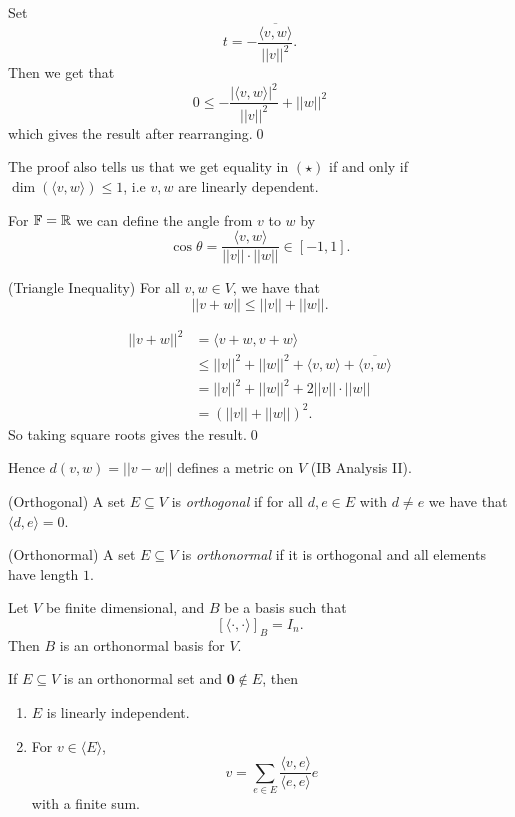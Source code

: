 \documentclass{article}
\newcommand{\F}{\mathbb{F}}
\begin{document}
Set 
\[
t=-\frac{\overline{\langle v,w\rangle}}{||v||^2}.
\]
Then we get that
\[
	0\le -\frac{|\langle v,w\rangle|^2}{||v||^2}+||w||^2
\]
which gives the result after rearranging.\qed
\begin{remark}
  The proof also tells us that we get equality in $ (\star) $ if and only if $ \dim(\langle v,w\rangle)\le 1 $, i.e $ v,w $ are linearly dependent.
\end{remark}
\begin{remark}
  For $ \F=\R $ we can define the angle from $ v $ to $ w $ by
  \[
	  \cos\theta=\frac{\langle v,w\rangle}{||v||\cdot||w||}\in [-1,1].
  \]
\end{remark}
\begin{corollary}
	(Triangle Inequality) For all $ v,w\in V $, we have that
	\[
	  ||v+w||\le ||v||+||w||.
	\]
\end{corollary}
\pf \begin{align*}
	||v+w||^2 &=\langle v+w,v+w\rangle\\
		  &\le ||v||^2+||w||^2+\langle v,w\rangle +\overline{\langle v,w\rangle}\\
		  &=||v||^2+||w||^2+2||v||\cdot||w||\\
		  &=(||v||+||w||)^2.
\end{align*}
So taking square roots gives the result.\qed
\par
Hence $ d(v,w)=||v-w|| $ defines a metric on $ V $ (IB Analysis II).
\begin{definition}
	(Orthogonal) A set $ E\subseteq V $ is \textit{orthogonal} if for all $ d,e\in E $ with $ d\ne e $ we have that $ \langle d,e\rangle=0 $.
\end{definition}
\begin{definition}
	(Orthonormal) A set $ E\subseteq V $ is \textit{orthonormal} if it is orthogonal and all elements have length $ 1 $.
\end{definition}
\begin{remark}
  Let $ V $ be finite dimensional, and $ B $ be a basis such that
  \[
	  [\langle\cdot,\cdot\rangle]_B=I_n.
  \]
  Then $ B $ is an orthonormal basis for $ V $.
\end{remark}
\begin{lemma}
  If $ E\subseteq V $ is an orthonormal set and $ \mathbf 0\notin E $, then
  \begin{enumerate}
	  \item $ E $ is linearly independent.
	  \item For $ v\in \langle E\rangle $,
		  \[
			  v=\sum_{e\in E}\frac{\langle v,e\rangle}{\langle e,e\rangle}e
		  \]
		  with a finite sum.
  \end{enumerate}
\end{lemma}
\end{document}
